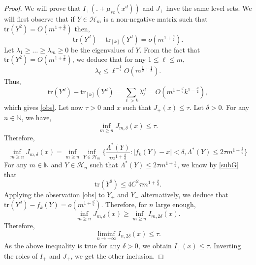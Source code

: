 \documentclass[aop,preprint]{imsart}
\newcommand\NN{\mathbb{N}}
\newcommand\tr{\mathrm{tr}}
\numberwithin{equation}{section}
\theoremstyle{definition}
\theoremstyle{plain}
\theoremstyle{remark}
\begin{document}
\begin{proof}
We will prove that $I_+(.+\mu_{sc}(x^d))$ and $J_+$ have the same level sets. We will first observe that if $Y\in\mathcal{H}_m$ is a non-negative matrix such that $\tr (Y^2) = O(m^{1+\frac{2}{d}})$ then,
\begin{equation} \label{obs} \tr (Y^d) - \tr_{[k]} (Y^d) = o( m^{1+\frac{d}{2}}).\end{equation}
Let $\lambda_1\geq\ldots\geq \lambda_m\geq 0$ be the eigenvalues of $Y$. From the fact that $\tr (Y^2) = O(m^{1+ \frac{2}{d}})$, we deduce that for any $1 \leq \ell \leq m$,
$$ \lambda_{\ell} \leq \ell^{-\frac{1}{2}}O(m^{\frac{1}{2}+\frac{1}{d}}).$$ 
Thus,
$$ \tr (Y^d) - \tr_{[k]}( Y^d)  = \sum_{\ell>k} \lambda_{\ell}^d = O(m^{1+\frac{d}{2}} k^{1-\frac{d}{2}}),$$
which gives \eqref{obs}.
Let now $\tau>0$ and $x$ such that $J_+(x) \leq \tau$. Let $\delta>0$. For any $n\in \NN$, we have,
$$ \inf_{m\geq n} J_{m,\delta}(x)\leq \tau.$$
Therefore,
$$ \inf_{m\geq n} J_{m,\delta}(x) = \inf_{m\geq n} \inf_{Y\in\mathcal{H}_m} \big \{ \frac{\Lambda^*(Y)}{m^{1+\frac{2}{d}}}  :  |f_k(Y) -x|<\delta, \Lambda^*(Y) \leq 2\tau m^{1+\frac{2}{d}}\big\}$$ 
For any $m\in\NN$ and $Y\in \mathcal{H}_n$ such that $\Lambda^*(Y) \leq 2\tau m^{1+\frac{2}{d}}$, we know by \eqref{subG} that 
$$ \tr(Y^2) \leq 4C^2 \tau m^{1+\frac{2}{d}}.$$
 Applying the observation \eqref{obs} to $Y_+$ and $Y_-$ alternatively, we deduce that $\tr(Y^d) - f_k(Y)=o(m^{1+\frac{d}{2}})$. Therefore, for $n$ large enough, 
$$ \inf_{m\geq n} J_{m,\delta}(x) \geq  \inf_{m\geq n} I_{m,2\delta}(x).$$
Therefore,
$$ \liminf_{n\to +\infty} I_{n,2\delta}(x) \leq \tau.$$
As the above inequality is true for any $\delta>0$, we obtain $I_+(x)\leq \tau$. Inverting the roles of $I_+$ and $J_+$, we get the other inclusion.







\end{proof}
\end{document}
